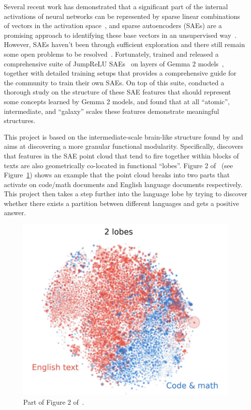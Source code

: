\documentclass{article}
\begin{document}
Several recent work has demonstrated that a significant part of the internal activations of neural
networks can be represented by sparse linear combinations of vectors in the activation
space~\citep{elhage2022Toy, olah2020Zoom, park2024Linear}, and sparse autoencoders (SAEs) are a
promising approach to identifying these base vectors in an unsupervised
way~\citep{bricken2023Monosemanticity, cunningham2023Sparse, gao2024Scaling,
  templeton2024Scaling}. However, SAEs haven't been through sufficient exploration and there still
remain some open problems to be resolved~\citep{templeton2024Scaling}. Fortunately,
\cite{lieberum2024Gemma} trained and released a comprehensive suite of JumpReLU
SAEs~\citep{rajamanoharan2024Jumping} on layers of Gemma 2 models~\citep{gemmateam2024Gemma2},
together with detailed training setups that provides a comprehensive guide for the community to
train their own SAEs. On top of this suite, \cite{li2024Geometry} conducted a thorough study on the
structure of these SAE features that should represent some concepts learned by Gemma 2 models, and
found that at all ``atomic'', intermediate, and ``galaxy'' scales these features demonstrate
meaningful structures.

This project is based on the intermediate-scale brain-like structure found by \cite{li2024Geometry}
and aims at discovering a more granular functional modularity. Specifically, \cite{li2024Geometry}
discovers that features in the SAE point cloud that tend to fire together within blocks of texts are
also geometrically co-located in functional ``lobes''. Figure 2 of~\cite{li2024Geometry} (see
Figure~\ref{fig:2-lobe-partition}) shows an example that the point cloud breaks into two parts that
activate on code/math documents and English language documents respectively. This project then takes
a step further into the language lobe by trying to discover whether there exists a partition between
different languages and gets a positive answer.
\begin{figure}[htbp]
\centerline{\includegraphics[width=0.5\linewidth]{figures/2-lobe-partition.jpg}}
\caption{Part of Figure 2 of~\cite{li2024Geometry}.}\label{fig:2-lobe-partition}
\end{figure}
\end{document}
